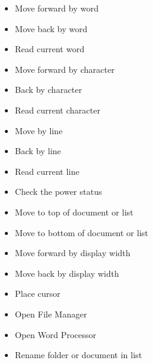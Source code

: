 \documentclass[10pt,letterpaper,twoside]{report}
\begin{document}
{\begin{enumerate}
\begin{itemize}
		      \item Move forward by word 
		      \item Move back by word 
		      \item Read current word 
		      \item Move forward by character 
		      \item Back by character 
		      \item Read current character 
		      \item Move by line 
		      \item Back by line 
		      \item Read current line 
		      \item Check the power status 
		      \item Move to top of document or list 
		      \item Move to bottom of document or list 
		      \item Move forward by display width 
		      \item Move back by display width  
		      \item Place cursor 
		      \item Open File Manager 
		      \item Open Word Processor 
		      \item Rename folder or document in list 

\end{itemize}
\end{enumerate}}
\end{document}
